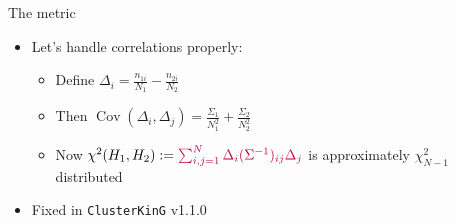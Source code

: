 \begin{frame}{The metric}
	\begin{itemize}
		\item Let's handle correlations properly: 
		\begin{itemize}
			\item Define $\Delta_i=\displaystyle\frac{n_{1i}}{N_1}-\frac{n_{2i}}{N_2}$
			\item Then $\operatorname{Cov}(\Delta_i, \Delta_j)=\displaystyle \frac{\Sigma_1}{N_1^2} + \frac{\Sigma_2}{N_2^2}$
			\item Now $\chi^2(H_1,H_2):= {\color{purple}\sum_{i,j=1}^N \Delta_i (\Sigma^{-1})_{ij} \Delta_j}$ is approximately $\chi^2_{N-1}$ distributed
		\end{itemize}
		\item Fixed in \texttt{ClusterKinG} v1.1.0
	\end{itemize}
\end{frame}

